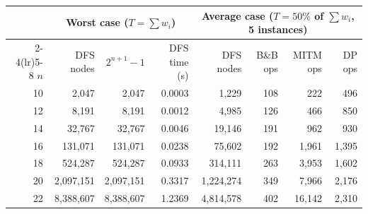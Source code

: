 \begin{tabular}{@{}r r r r r r r r@{}}
\toprule
 & \multicolumn{3}{c}{Worst case ($T=\sum w_i$)} & \multicolumn{4}{c}{Average case ($T=50\%$ of $\sum w_i$, 5 instances)}\\
\cmidrule(lr){2-4}\cmidrule(lr){5-8}
$n$ & DFS nodes & $2^{n+1}-1$ & DFS time (s) & DFS nodes & B\&B ops & MITM ops & DP ops\\
\midrule
10 & 2,047 & 2,047 & 0.0003 & 1,229 & 108 & 222 & 496\\
12 & 8,191 & 8,191 & 0.0012 & 4,985 & 126 & 466 & 850\\
14 & 32,767 & 32,767 & 0.0046 & 19,146 & 191 & 962 & 930\\
16 & 131,071 & 131,071 & 0.0238 & 75,602 & 192 & 1,961 & 1,395\\
18 & 524,287 & 524,287 & 0.0933 & 314,111 & 263 & 3,953 & 1,602\\
20 & 2,097,151 & 2,097,151 & 0.3317 & 1,224,274 & 349 & 7,966 & 2,176\\
22 & 8,388,607 & 8,388,607 & 1.2369 & 4,814,578 & 402 & 16,142 & 2,310\\
\bottomrule
\end{tabular}
